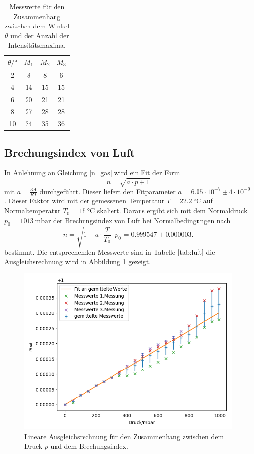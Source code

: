\begin{table}
  \caption{Messwerte für den Zusammenhang zwischen dem Winkel $\theta$ und der Anzahl
  der Intensitätsmaxima.}
  \label{tab:glas}
  \centering
  \begin{tabular}{c|c|c|c}
    $\theta/°$ & $M_1$ & $M_2$ & $M_3$ \\ \midrule
    2 & 8 & 8 & 6 \\
    4 & 14  & 15  & 15 \\
    6 & 20  & 21  & 21 \\
    8 & 27  & 28  & 28 \\
    10 & 34 & 35  & 36
  \end{tabular}
\end{table}

\subsection{Brechungsindex von Luft}

In Anlehnung an Gleichung \ref{n_gas} wird ein Fit der Form
\[
n = \sqrt{a \cdot p + 1}
\]
mit $a = \frac{3A}{RT}$ durchgeführt. Dieser liefert den Fitparameter
$a = 6.05 \cdot 10^{-7} \pm 4 \cdot 10^{-9}$. Dieser Faktor wird mit der gemessenen Temperatur
$T = \SI{22.2}{\degreeCelsius}$ auf Normaltemperatur $T_0 = \SI{15}{\degreeCelsius}$ skaliert.
Daraus ergibt sich mit dem Normaldruck $p_0 = \SI{1013}{\milli\bar}$ der Brechungsindex von Luft bei
Normalbedingungen nach
\[
n = \sqrt{1 - a \cdot \frac{T}{T_0} \cdot p_0} = 0.999547 \pm 0.000003.
\]
bestimmt. Die entsprechenden Messwerte sind in Tabelle \ref{tab:luft} die Ausgleichsrechnung wird
in Abbildung \ref{n_luft} gezeigt.

\begin{figure}[h]
\centering
\includegraphics[width=\linewidth]{img/n_luft.png}
\caption{Lineare Ausgleichsrechnung für den Zusammenhang zwischen dem Druck $p$ und dem Brechungsindex.}
\label{n_luft}
\end{figure}

